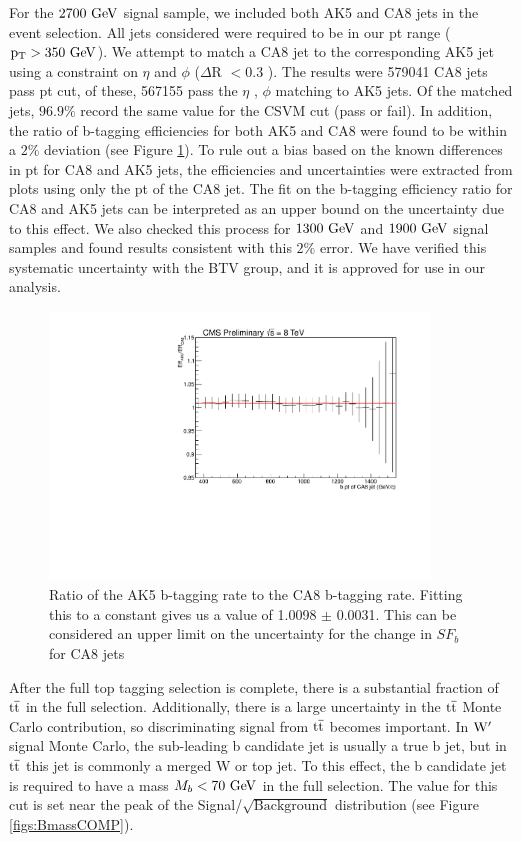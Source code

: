 For the $2700~\mathrm{GeV}$ signal sample, we 
included both AK5 and CA8 jets in the event selection.  All jets considered were required to be in our pt range ($\mathrm{p_{T}} > 350~\mathrm{GeV}$).  We attempt to match a CA8 jet to 
the corresponding AK5 jet using a constraint on $\eta$ and $\phi$ ($\Delta$R $< 0.3$ ).  The results were 579041 CA8 jets pass pt cut,
of these, 567155 pass the $\eta$ , $\phi$ matching to AK5 jets.  Of the matched jets, $96.9\%$ record the same value for the CSVM cut (pass or fail). In addition, 
the ratio of b-tagging efficiencies for both AK5 and CA8 were found to be within a $2\%$ deviation (see Figure \ref{figs:btageff}).  To rule out a bias based on the 
known differences in pt for CA8 and AK5 jets, the efficiencies and uncertainties were extracted from plots using only the pt of the CA8 jet.  
The fit on the b-tagging efficiency ratio for CA8 and AK5 jets can be interpreted as an upper bound on the uncertainty due to this effect.
We also checked this process for $1300~\mathrm{GeV}$ and $1900~\mathrm{GeV}$ signal samples and found results consistent with this $2\%$ error. 
We have verified this systematic uncertainty with the BTV group, and it is approved for use in our analysis.

\begin{figure}[htcb]
\centering
\includegraphics[width=0.9\textwidth]{AN-13-004/figs/EfficiencyCompCAptr32700.pdf}
\caption{Ratio of the AK5 b-tagging rate to the CA8 b-tagging rate. Fitting this to a constant gives us a value of 1.0098 $\pm$ 0.0031.  This can 
be considered an upper limit on the uncertainty for the change in $SF_b$ for CA8 jets}

\label{figs:btageff}
\end{figure}

After the full top tagging selection is complete, there is a substantial fraction of $\mathrm{t\overline{t}}$ in the full selection.
Additionally, there is a large uncertainty in the $\mathrm{t\overline{t}}$ Monte Carlo contribution, so discriminating signal from $\mathrm{t\overline{t}}$ becomes important.  
In $\mathrm{W}^\prime$ signal Monte Carlo, the sub-leading b candidate jet is usually a true b jet, but in $\mathrm{t\overline{t}}$ this jet is commonly a merged W or top jet. 
To this effect, the b candidate jet is required to have a mass $M_b < 70~\mathrm{GeV}$ in the full selection.  The value for this cut is set near the peak of the Signal/$\sqrt{\text{Background}}$ distribution (see Figure \ref{figs:BmassCOMP}).


